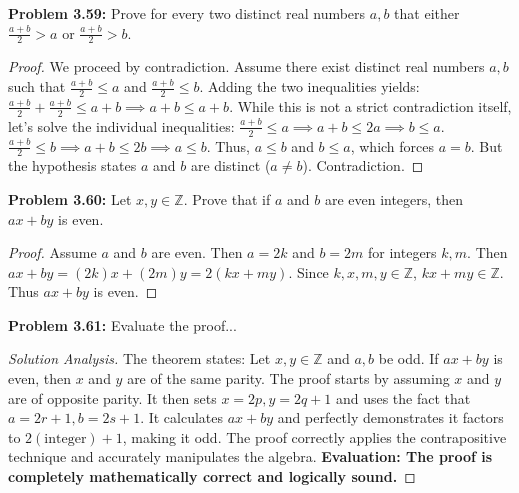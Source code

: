 \documentclass[11pt, letterpaper]{article}
\theoremstyle{definition}
\theoremstyle{remark}
\newcommand{\Z}{\mathbb{Z}}
\begin{document}
\textbf{Problem 3.59:} Prove for every two distinct real numbers $a,b$ that either $\frac{a+b}{2} > a$ or $\frac{a+b}{2} > b$.
\begin{proof}
We proceed by contradiction. Assume there exist distinct real numbers $a,b$ such that $\frac{a+b}{2} \le a$ and $\frac{a+b}{2} \le b$.
Adding the two inequalities yields:
$\frac{a+b}{2} + \frac{a+b}{2} \le a + b \implies a+b \le a+b$.
While this is not a strict contradiction itself, let's solve the individual inequalities:
$\frac{a+b}{2} \le a \implies a+b \le 2a \implies b \le a$.
$\frac{a+b}{2} \le b \implies a+b \le 2b \implies a \le b$.
Thus, $a \le b$ and $b \le a$, which forces $a=b$. But the hypothesis states $a$ and $b$ are distinct ($a \neq b$). Contradiction.
\end{proof}

\textbf{Problem 3.60:} Let $x, y \in \Z$. Prove that if $a$ and $b$ are even integers, then $ax+by$ is even.
\begin{proof}
Assume $a$ and $b$ are even. Then $a = 2k$ and $b = 2m$ for integers $k,m$.
Then $ax+by = (2k)x + (2m)y = 2(kx + my)$.
Since $k,x,m,y \in \Z$, $kx+my \in \Z$. Thus $ax+by$ is even.
\end{proof}

\textbf{Problem 3.61:} Evaluate the proof...
\begin{proof}[Solution Analysis]
The theorem states: Let $x, y \in \Z$ and $a,b$ be odd. If $ax+by$ is even, then $x$ and $y$ are of the same parity.
The proof starts by assuming $x$ and $y$ are of opposite parity. It then sets $x=2p, y=2q+1$ and uses the fact that $a=2r+1, b=2s+1$. It calculates $ax+by$ and perfectly demonstrates it factors to $2(\text{integer}) + 1$, making it odd.
The proof correctly applies the contrapositive technique and accurately manipulates the algebra. \textbf{Evaluation: The proof is completely mathematically correct and logically sound.}
\end{proof}
\end{document}
